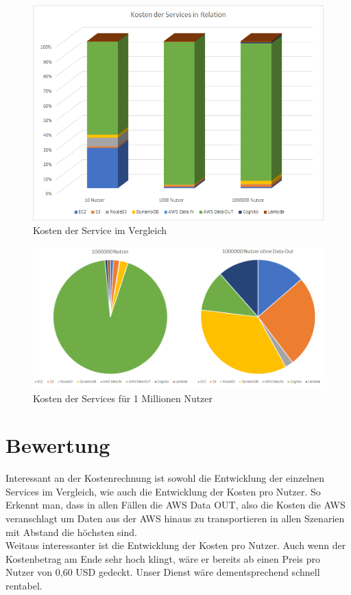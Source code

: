 \documentclass[a4paper, 12pt]{scrreprt}
\renewcommand\_{\textunderscore\allowbreak}
\begin{document}
\begin{figure}[h!]
\centering
\includegraphics[scale=1]{costs-overview.png}
\caption{Kosten der Service im Vergleich}
\end{figure}

\begin{figure}[h!]
\centering
\includegraphics[scale=0.75]{million-costs.png}
\caption{Kosten der Services für 1 Millionen Nutzer}
\end{figure}

\section{Bewertung}
Interessant an der Kostenrechnung ist sowohl die Entwicklung der einzelnen Services im Vergleich, wie auch die Entwicklung der Kosten pro Nutzer. So Erkennt man, dass in allen Fällen die AWS Data OUT, also die Kosten die AWS veranschlagt um Daten aus der AWS hinaus zu transportieren in allen Szenarien mit Abstand die höchsten sind. \\
Weitaus interessanter ist die Entwicklung der Kosten pro Nutzer. Auch wenn der Kostenbetrag am Ende sehr hoch klingt, wäre er bereits ab einen Preis pro Nutzer von 0,60 USD gedeckt. Unser Dienst wäre dementsprechend schnell rentabel.
\end{document}
